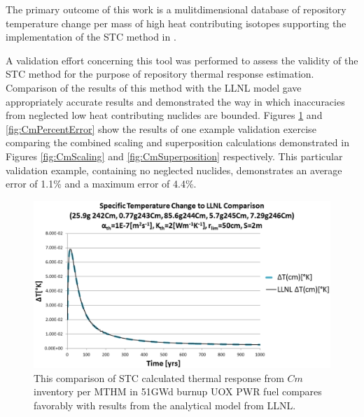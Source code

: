 
The primary outcome of this work is a mulitdimensional database of repository temperature 
change per mass of high heat contributing isotopes supporting the implementation 
of the \gls{STC} method in \Cyder. 

A validation effort concerning this tool was performed to assess the validity 
of the \gls{STC} method for the purpose of repository thermal response 
estimation.  Comparison of the results of this method with the \gls{LLNL} model 
\cite{greenberg_application_2012} gave appropriately accurate results and 
demonstrated the way in which inaccuracies from neglected low heat contributing 
nuclides are bounded. Figures \ref{fig:CmValidation} and 
\ref{fig:CmPercentError} show the results of one example validation exercise 
comparing the combined scaling and  superposition calculations demonstrated in 
Figures \ref{fig:CmScaling} and \ref{fig:CmSuperposition} respectively. This 
particular validation example, containing no neglected nuclides, demonstrates 
an average error of 1.1\% and a maximum error of 4.4\%.

\begin{figure}[htp!]
\begin{center}
\includegraphics[width=\columnwidth]{./chapters/methodology/thermal_models/CmValidation.eps}
\end{center}
\caption{This comparison of \gls{STC} calculated thermal response from $Cm$ 
inventory per MTHM in 51GWd burnup UOX PWR fuel compares favorably with results 
from the analytical model from LLNL.} 
\label{fig:CmValidation}
\end{figure}

